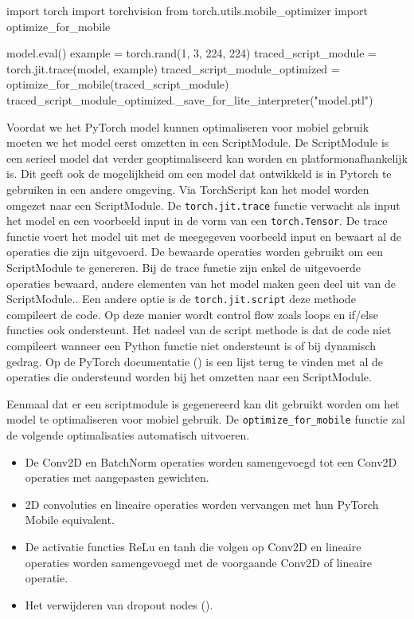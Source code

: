 \begin{python}
import torch
import torchvision
from torch.utils.mobile_optimizer import optimize_for_mobile
	
model.eval()
example = torch.rand(1, 3, 224, 224)
traced_script_module = torch.jit.trace(model, example)
traced_script_module_optimized = optimize_for_mobile(traced_script_module)
traced_script_module_optimized._save_for_lite_interpreter("model.ptl")
\end{python}

Voordat we het PyTorch model kunnen optimaliseren voor mobiel gebruik moeten we het model eerst omzetten in een ScriptModule.
De ScriptModule is een serieel model dat verder geoptimaliseerd kan worden en platformonafhankelijk is.
Dit geeft ook de mogelijkheid om een model dat ontwikkeld is in Pytorch te gebruiken in een andere omgeving.
Via TorchScript kan het model worden omgezet naar een ScriptModule.
De \texttt{torch.jit.trace} functie verwacht als input het model en een voorbeeld input in de vorm van een \texttt{torch.Tensor}.
De trace functie voert het model uit met de meegegeven voorbeeld input en bewaart al de operaties die zijn uitgevoerd.
De bewaarde operaties worden gebruikt om een ScriptModule te genereren.
Bij de trace functie zijn enkel de uitgevoerde operaties bewaard, andere elementen van het model maken geen deel uit van de ScriptModule..
Een andere optie is de \texttt{torch.jit.script} deze methode compileert de code.
Op deze manier wordt control flow zoals loops en if/else functies ook ondersteunt.
Het nadeel van de script methode is dat de code niet compileert wanneer een Python functie niet ondersteunt is of bij dynamisch gedrag.
Op de PyTorch documentatie (\cite{Facebook_PyTorch_2017}) is een lijst terug te vinden met al de operaties die ondersteund worden bij het omzetten naar een ScriptModule.

Eenmaal dat er een scriptmodule is gegenereerd kan dit gebruikt worden om het model te optimaliseren voor mobiel gebruik.
De \texttt{optimize\_for\_mobile} functie zal de volgende optimalisaties automatisch uitvoeren.

\begin{itemize}
	\item De Conv2D en BatchNorm operaties worden samengevoegd tot een Conv2D operaties met aangepasten gewichten.
	\item 2D convoluties en lineaire operaties worden vervangen met hun PyTorch Mobile equivalent.
	\item De activatie functies ReLu en tanh die volgen op Conv2D en lineaire operaties worden samengevoegd met de voorgaande Conv2D of lineaire operatie.
	\item Het verwijderen van dropout nodes (\cite{Facebook_PyTorch_2017}).
\end{itemize}

